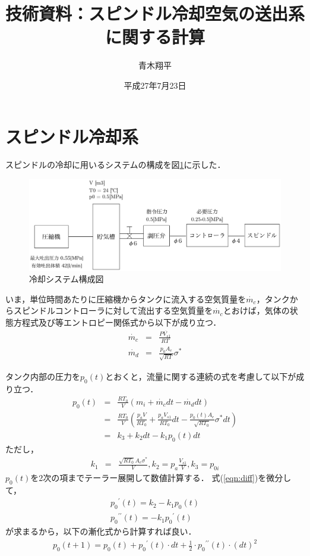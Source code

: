 \documentclass{jsarticle}
\begin{document}
\title{技術資料：スピンドル冷却空気の送出系に関する計算}
\author{青木翔平}
\date{平成27年7月23日}
\maketitle

\section{スピンドル冷却系}
スピンドルの冷却に用いるシステムの構成を図\ref{fig:system}に示した．
\begin{figure}[htbp]
 \centering
 \includegraphics[width=150mm]{system.pdf}
 \caption{冷却システム構成図}
 \label{fig:system}
\end{figure}

いま，単位時間あたりに圧縮機からタンクに流入する空気質量を$\dot{m_{c}}$，タンクからスピンドルコントローラに対して流出する空気質量を$\dot{m_{c}}$とおけば，気体の状態方程式及び等エントロピー関係式から以下が成り立つ．
\begin{eqnarray}
  \dot{m_c} & = &  \frac{P\dot{V_{s1}}}{RT}  \\
  \dot{m_d} & = & \frac{p_0 A_e }{\sqrt{R T}}\sigma^{*}
\end{eqnarray}


タンク内部の圧力を$p_0(t)$とおくと，流量に関する連続の式を考慮して以下が成り立つ．
\begin{eqnarray}
  p_0(t) & = & \frac{R T_0}{V} \left( m_i + \dot{m_c} dt - \dot{m_d} dt \right) \nonumber \\
  & = & \frac{R T_0}{V} \left( \frac{p_a V}{R T_0} + \frac{p_a V_{s1}}{R T_0}dt - \frac{p_0(t) A_e}{\sqrt{R T_0}} \sigma^{*} dt \right) \nonumber \\
  & = & k_3 + k_2 dt - k_1 p_0(t) dt \label{eqn:diff} 
\end{eqnarray}
ただし，
\begin{eqnarray}
  k_1 & = & \frac{\sqrt{R T_0} A_e \sigma^{*}}{V}, k_2 = p_a \frac{V_{s1}}{V}, k_3 = p_{0i}
\end{eqnarray}
$p_0(t)$を2次の項までテーラー展開して数値計算する．
式(\ref{eqn:diff})を微分して，
\begin{eqnarray}
  {p_0}^{\prime}(t) = k_2 - k_1 p_0(t) \\
  {p_0}^{\prime\prime}(t) = - k_1 {p_0}^{{\prime}}(t) 
\end{eqnarray}
が求まるから，以下の漸化式から計算すれば良い．
\begin{eqnarray}
{p_0}(t+1) = {p_0}(t) + {p_0}^{\prime}(t) \cdot dt + \frac{1}{2} \cdot {p_0}^{\prime\prime}(t) \cdot (dt)^{2}
\end{eqnarray}
\end{document}
